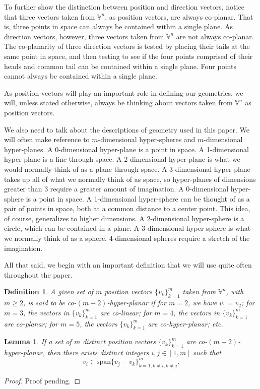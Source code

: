 \documentclass{article}
\newcommand{\V}{\mathbb{V}}
\newtheorem{definition}{Definition}[section]
\newtheorem{lemma}{Lemma}[section]
\begin{document}
To further show the distinction between position and direction vectors, notice that
three vectors taken from $\V^n$, as position vectors, are always co-planar.  That is,
three points in space can always be contained within a single plane.
As direction vectors, however, three vectors taken from $\V^n$ are not always co-planar.
The co-planarity of three direction vectors is tested by placing their tails at
the same point in space, and then testing to see if the four points comprised of their
heads and common tail can be contained within a single plane.  Four points cannot
always be contained within a single plane.

As position vectors will play an important role in defining our geometries,
we will, unless stated otherwise, always be thinking about vectors taken from
$\V^n$ as position vectors.

We also need to talk about the descriptions of geometry used in this paper.
We will often make reference to $m$-dimensional hyper-spheres and $m$-dimensional hyper-planes.
A 0-dimensional hyper-plane is a point in space.  A 1-dimensional hyper-plane is
a line through space.  A 2-dimensional hyper-plane is what we would normally think of
as a plane through space.  A 3-dimensional hyper-plane takes up all of what we normally
think of as space, so hyper-planes of dimensions greater than 3 require a greater amount
of imagination.  A 0-dimensional hyper-sphere is a point in space.  A 1-dimensional hyper-sphere
can be thought of as a pair of points in space, both at a common distance to a center
point.  This idea, of course, generalizes to higher dimensions.  A 2-dimensional hyper-sphere
is a circle, which can be contained in a plane.  A 3-dimensional hyper-sphere is what
we normally think of as a sphere.  4-dimensional spheres require a stretch of the imagination.

All that said, we begin with an important definition that we will use quite often throughout
the paper.

\begin{definition}
A given set of $m$ position vectors $\{v_k\}_{k=1}^m$ taken from $\V^n$, with
$m\geq 2$, is said to be co-$(m-2)$-hyper-planar if for $m=2$, we have $v_1=v_2$;
for $m=3$, the vectors in $\{v_k\}_{k=1}^m$ are co-linear; for $m=4$, the vectors
in $\{v_k\}_{k=1}^m$ are co-planar; for $m=5$, the vectors $\{v_k\}_{k=1}^m$ are
co-hyper-planar; etc.
\end{definition}

\begin{lemma}\label{lma_co_hyper_planar_characterization}
If a set of $m$ distinct position vectors $\{v_k\}_{k=1}^m$ are co-$(m-2)$-hyper-planar,
then there exists distinct integers $i,j\in[1,m]$ such that
\begin{equation*}
v_i\in\mbox{span}\{v_j-v_k\}_{k=1,k\neq i,k\neq j}^m.
\end{equation*}
\end{lemma}
\begin{proof}
Proof pending.
\end{proof}
\end{document}
